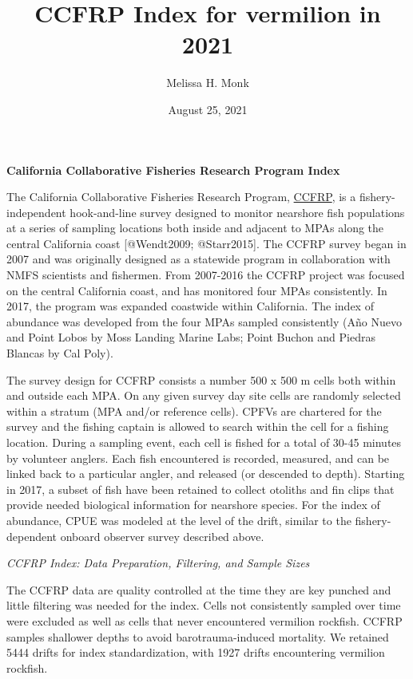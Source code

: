 \documentclass[
]{article}
\title{CCFRP Index for vermilion in 2021}
\author{Melissa H. Monk}
\date{August 25, 2021}
\begin{document}
\maketitle

{
\setcounter{tocdepth}{2}
\tableofcontents
}
\textbf{California Collaborative Fisheries Research Program Index}

The California Collaborative Fisheries Research Program, \href{https://www.mlml.calstate.edu/ccfrp/}{CCFRP},
is a fishery-independent
hook-and-line survey designed to monitor nearshore fish populations at a series of sampling
locations both inside and adjacent to MPAs along the central California coast
{[}@Wendt2009; @Starr2015{]}. The CCFRP survey began in 2007 and was originally
designed as a statewide program in collaboration with NMFS scientists and fishermen.
From 2007-2016 the CCFRP project was focused on the central California coast, and has monitored
four MPAs consistently. In 2017,
the program was expanded coastwide within California. The index of abundance was
developed from the four MPAs sampled consistently (Año Nuevo and Point Lobos
by Moss Landing Marine Labs; Point Buchon and Piedras Blancas by Cal Poly).

The survey design for CCFRP consists a number 500 x 500 m cells both within and
outside each MPA. On any given survey day site cells are randomly
selected within a stratum (MPA and/or reference cells). CPFVs are chartered
for the survey and the fishing captain is allowed to search within the cell for
a fishing location. During a sampling event, each cell is fished for a total of
30-45 minutes by volunteer anglers. Each fish encountered is recorded, measured,
and can be linked back to a particular angler, and released (or descended to depth).
Starting in 2017, a subset of fish have been retained to collect otoliths and fin
clips that provide needed biological information for nearshore species. For the index of abundance, CPUE was modeled at the level of the drift, similar to the
fishery-dependent onboard observer survey described above.

\emph{CCFRP Index: Data Preparation, Filtering, and Sample Sizes}

The CCFRP data are quality controlled at the time they are key punched and little
filtering was needed for the index.
Cells not consistently sampled over time were excluded as well as cells that never encountered vermilion rockfish. CCFRP samples shallower
depths to avoid barotrauma-induced mortality. We retained 5444 drifts for index standardization, with 1927 drifts encountering vermilion rockfish.
\end{document}
